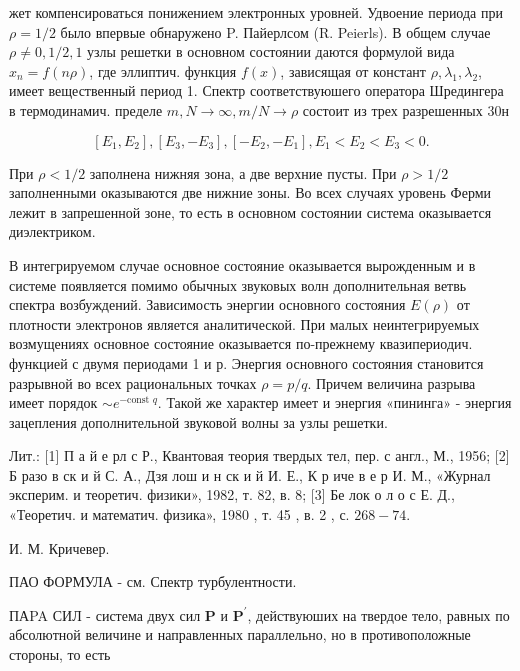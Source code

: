 \documentclass[10pt]{article}
\begin{document}
жет компенсироваться понижением электронных уровней. Удвоение периода при $\rho=1 / 2$ было впервые обнаружено P. Пайерлсом (R. Peierls). В общем случае $\rho \neq 0,1 / 2,1$ узлы решетки в основном состоянии даются формулой вида $x_{n}=f(n \rho)$, где эллиптич. функция $f(x)$, зависящая от констант $\rho, \lambda_{1}, \lambda_{2}$, имеет вещественный период 1. Спектр соответствуюшего оператора Шредингера в термодинамич. пределе $m, N \rightarrow \infty, m / N \rightarrow \rho$ состоит из трех разрешенных 30н



\[

\left[E_{1}, E_{2}\right],\left[E_{3},-E_{3}\right],\left[-E_{2},-E_{1}\right], E_{1}<E_{2}<E_{3}<0 .

\]



При $\rho<1 / 2$ заполнена нижняя зона, а две верхние пусты. При $\rho>1 / 2$ заполненными оказываются две нижние зоны. Во всех случаях уровень Ферми лежит в запрешенной зоне, то есть в основном состоянии система оказывается диэлектриком.



В интегрируемом случае основное состояние оказывается вырожденным и в системе появляется помимо обычных звуковых волн дополнительная ветвь спектра возбуждений. Зависимость энергии основного состояния $E(\rho)$ от плотности электронов является аналитической. При малых неинтегрируемых возмущениях основное состояние оказывается по-прежнему квазипериодич. функцией с двумя периодами 1 и р. Энергия основного состояния становится разрывной во всех рациональных точках $\rho=p / q$. Причем величина разрыва имеет порядок $\sim e^{- \text {const } q}$. Такой же характер имеет и энергия «пининга» - энергия зацепления дополнительной звуковой волны за узлы решетки.



Лит.: [1] П а й е рл с Р., Квантовая теория твердых тел, пер. с англ., М., 1956; [2] Б разо в ск и й С. А., Дзя лош и н ск и й И. Е., К р иче в е р И. М., «Журнал эксперим. и теоретич. физики», 1982, т. 82, в. 8; [3] Бе лок о л о с Е. Д., «Теоретич. и математич. физика», 1980 , т. 45 , в. 2 , с. $268-74$.



И. М. Кричевер.



ПАО ФОРМУЛА - см. Спектр турбулентности.



ПАPA СИЛ - система двух сил $\boldsymbol{P}$ и $\boldsymbol{P}^{\prime}$, действуюших на твердое тело, равных по абсолютной величине и направленных параллельно, но в противоположные стороны, то есть
\end{document}
